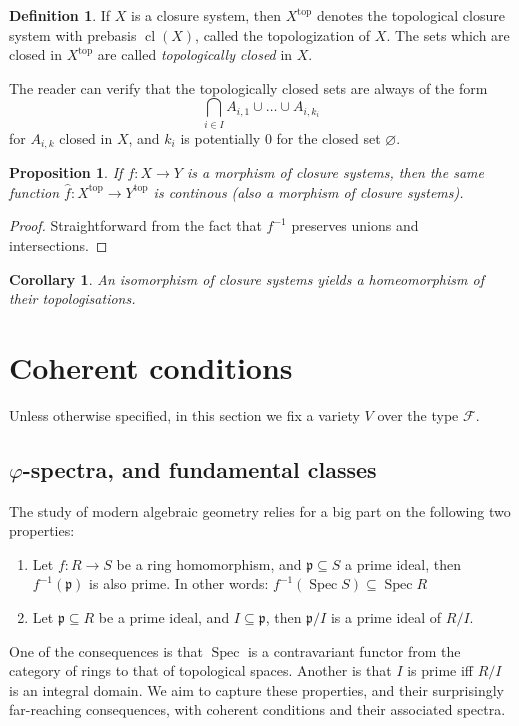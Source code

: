 \documentclass{article}
\theoremstyle{plain}
\newtheorem{corollary}[theorem]{Corollary}
\newtheorem{proposition}[theorem]{Proposition}
\theoremstyle{definition}
\newtheorem{definition}{Definition}[section]
\newcommand{\Spec}{\operatorname{Spec}}
\begin{document}
\begin{definition}
    If $X$ is a closure system, then $X^\text{top}$ denotes the topological closure system with prebasis $\operatorname{cl}(X)$, called the topologization of $X$.
    The sets which are closed in $X^\text{top}$ are called \textit{topologically closed} in $X$.
\end{definition}

The reader can verify that the topologically closed sets are always of the form
$$\bigcap_{i \in I} A_{i, 1} \cup \dots\cup A_{i, k_i}$$
for $A_{i, k}$ closed in $X$, and $k_i$ is potentially $0$ for the closed set $\varnothing$.

\begin{proposition} \label{prop:topisendfunc}
    If $f\colon X\rightarrow Y$ is a morphism of closure systems, then the same function
    $\hat{f} \colon X^\text{top} \rightarrow Y^\text{top}$ is continous (also a morphism of closure systems).
\end{proposition}
\begin{proof}
    Straightforward from the fact that $f^{-1}$ preserves unions and intersections.
\end{proof}

\begin{corollary}
    An isomorphism of closure systems yields a homeomorphism of their topologisations.
\end{corollary}


\pagebreak


\section{Coherent conditions}

Unless otherwise specified, in this section we fix a variety $V$ over the type $\mathscr{F}$.

\subsection{$\varphi$-spectra, and fundamental classes}

The study of modern algebraic geometry relies for a big part on the following two properties:
\begin{enumerate}
    \item Let $f\colon R\rightarrow S$ be a ring homomorphism, and $\mathfrak{p}\subseteq S$ a prime ideal, then $f^{-1}(\mathfrak{p})$ is also prime.
    In other words: $f^{-1}(\Spec S) \subseteq \Spec R$
    \item Let $\mathfrak{p}\subseteq R$ be a prime ideal, and $I\subseteq\mathfrak{p}$, then $\mathfrak{p}/I$ is a prime ideal of $R/I$.
\end{enumerate}
One of the consequences is that $\Spec$ is a contravariant functor from the category of rings to that of topological spaces.
Another is that $I$ is prime iff $R/I$ is an integral domain.
We aim to capture these properties, and their surprisingly far-reaching consequences, with coherent conditions and their associated spectra.
\end{document}
